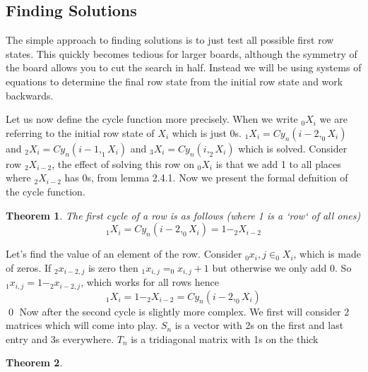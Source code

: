 \documentclass{article}
\newtheorem{theorem}{Theorem}[subsection]
\begin{document}
  \subsection{Finding Solutions}
  The simple approach to finding solutions is to just test all possible first row states. This quickly becomes tedious for larger boards, although the symmetry of the board allows you to cut the search in half. Instead we will be using systems of equations to determine the final row state from the initial row state and work backwards.\par
  Let us now define the cycle function more precisely. When we write $_0X_i$ we are referring to the initial row state of $X_i$ which is just 0s. $_1X_i=Cy_n(i-2,_0X_i)$ and $_2X_i=Cy_n(i-1,_1X_i)$ and $_3X_i=Cy_n(i,_2X_i)$ which is solved. Consider row $_2X_{i-2}$, the effect of solving this row on $_0X_i$ is that we add 1 to all places where $_2X_{i-2}$ has 0s, from lemma 2.4.1. Now we present the formal defnition of the cycle function.
  \begin{theorem}
    The first cycle of a row is as follows (where 1 is a `row` of all ones)
    \[
      _1X_i=Cy_n(i-2,_0X_i)=1-_2X_{i-2}
    \]
  \end{theorem}
  Let's find the value of an element of the row. Consider $_0x_i,j\in_0X_i$, which is made of zeros. If $_2x_{i-2,j}$ is zero then $_1x_{i,j}=_0x_{i,j}+1$ but otherwise we only add 0. So $_1x_{i,j}=1-_2x_{i-2,j}$, which works for all rows hence
  \[_1X_i=1-_2X_{i-2}=Cy_n(i-2,_0X_i)\]\qed
  Now after the second cycle is slightly more complex. We first will consider 2 matrices which will come into play. $S_n$ is a vector with 2s on the first and last entry and 3s everywhere. $T_n$ is a tridiagonal matrix with 1s on the thick
  \begin{theorem}

  \end{theorem}
\end{document}

